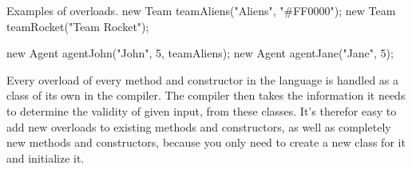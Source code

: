 \begin{source}{Examples of overloads.}{}
	new Team teamAliens("Aliens", "#FF0000");
	new Team teamRocket("Team Rocket");
	
	new Agent agentJohn("John", 5, teamAliens);
	new Agent agentJane("Jane", 5);
\end{source}

Every overload of every method and constructor in the language is handled as a class of its own in the compiler. 
The compiler then takes the information it needs to determine the validity of given input, from these classes. 
It's therefor easy to add new overloads to existing methods and constructors, as well as completely new methods and constructors, because you only need to create a new class for it and initialize it.